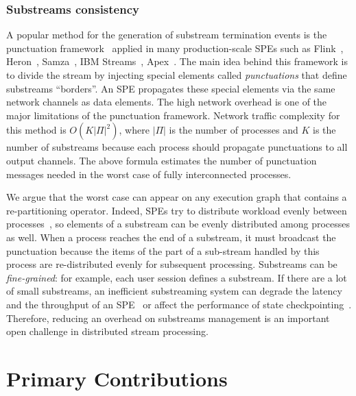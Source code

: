\subsubsection{Substreams consistency}

A popular method for the generation of substream termination events is the punctuation framework~\cite{tucker2003exploiting} applied in many production-scale SPEs such as Flink~\cite{carbone2015apache}, Heron~\cite{Kulkarni:2015:THS:2723372.2742788}, Samza~\cite{Noghabi:2017:SSS:3137765.3137770}, IBM Streams~\cite{jacques2016consistent}, Apex~\cite{pathak2016introduction}. The main idea behind this framework is to divide the stream by injecting special elements called {\em punctuations} that define substreams ``borders''. An SPE propagates these special elements via the same network channels as data elements. The high network overhead is one of the major limitations of the punctuation framework. Network traffic complexity for this method is $O(K|\Pi|^2)$, where $|\Pi|$ is the number of processes and $K$ is the number of substreams because each process should propagate punctuations to all output channels. The above formula estimates the number of punctuation messages needed in the worst case of fully interconnected processes. 

We argue that the worst case can appear on any execution graph that contains a re-partitioning operator. Indeed, SPEs try to distribute workload evenly between processes~\cite{carbone2015apache, Kulkarni:2015:THS:2723372.2742788, Akidau:2013:MFS:2536222.2536229}, so elements of a substream can be evenly distributed among processes as well. When a process reaches the end of a substream, it must broadcast the punctuation because the items of the part of a sub-stream handled by this process are re-distributed evenly for subsequent processing. Substreams can be {\em fine-grained}: for example, each user session defines a substream. If there are a lot of small substreams, an inefficient substreaming system can degrade the latency~\cite{DBLP:journals/pvldb/BegoliACHKKMS21} and the throughput of an SPE~\cite{Li:2008:OPN:1453856.1453890} or affect the performance of state checkpointing~\cite{zhang2021research}. Therefore, reducing an overhead on substreams management is an important open challenge in distributed stream processing.

\section{Primary Contributions}
\label{thesis-intro-contributions}

